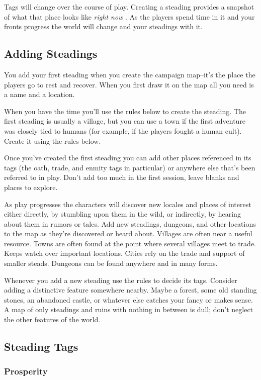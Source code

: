  Tags will change over the course of play. Creating a steading provides a snapshot of what that place looks like \emph{right now}
. As the players spend time in it and your fronts progress the world will change and your steadings with it.
\subsection{Adding Steadings}


 You add your first steading when you create the campaign map--it's the place the players go to rest and recover. When you first draw it on the map all you need is a name and a location.


 When you have the time you'll use the rules below to create the steading. The first steading is usually a village, but you can use a town if the first adventure was closely tied to humans (for example, if the players fought a human cult). Create it using the rules below.


 Once you've created the first steading you can add other places referenced in its tags (the oath, trade, and enmity tags in particular) or anywhere else that's been referred to in play. Don't add too much in the first session, leave blanks and places to explore.


 As play progresses the characters will discover new locales and places of interest either directly, by stumbling upon them in the wild, or indirectly, by hearing about them in rumors or tales. Add new steadings, dungeons, and other locations to the map as they're discovered or heard about. Villages are often near a useful resource. Towns are often found at the point where several villages meet to trade. Keeps watch over important locations. Cities rely on the trade and support of smaller steads. Dungeons can be found anywhere and in many forms.


 Whenever you add a new steading use the rules to decide its tags. Consider adding a distinctive feature somewhere nearby. Maybe a forest, some old standing stones, an abandoned castle, or whatever else catches your fancy or makes sense. A map of only steadings and ruins with nothing in between is dull; don't neglect the other features of the world.
\subsection{Steading Tags}
\subsubsection{Prosperity}


